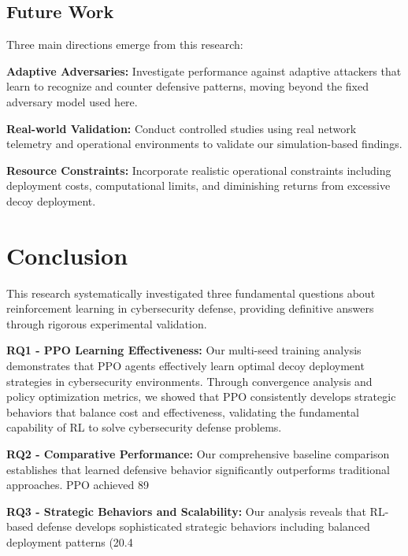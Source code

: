 \documentclass[12pt,oneside]{article}
\begin{document}
\subsection{Future Work}

Three main directions emerge from this research:

\textbf{Adaptive Adversaries:} Investigate performance against adaptive attackers that learn to recognize and counter defensive patterns, moving beyond the fixed adversary model used here.

\textbf{Real-world Validation:} Conduct controlled studies using real network telemetry and operational environments to validate our simulation-based findings.

\textbf{Resource Constraints:} Incorporate realistic operational constraints including deployment costs, computational limits, and diminishing returns from excessive decoy deployment.




\clearpage
\section{Conclusion}

This research systematically investigated three fundamental questions about reinforcement learning in cybersecurity defense, providing definitive answers through rigorous experimental validation.

\textbf{RQ1 - PPO Learning Effectiveness:} Our multi-seed training analysis demonstrates that PPO agents effectively learn optimal decoy deployment strategies in cybersecurity environments. Through convergence analysis and policy optimization metrics, we showed that PPO consistently develops strategic behaviors that balance cost and effectiveness, validating the fundamental capability of RL to solve cybersecurity defense problems.

\textbf{RQ2 - Comparative Performance:} Our comprehensive baseline comparison establishes that learned defensive behavior significantly outperforms traditional approaches. PPO achieved 89%

\textbf{RQ3 - Strategic Behaviors and Scalability:} Our analysis reveals that RL-based defense develops sophisticated strategic behaviors including balanced deployment patterns (20.4%
\end{document}
